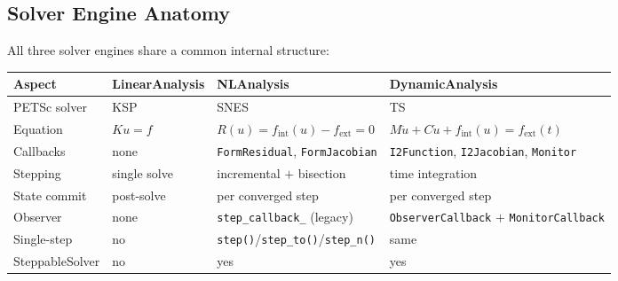 \subsection{Solver Engine Anatomy}
\label{sec:arch:analysis:solvers}

All three solver engines share a common internal structure:

\begin{center}
\small
\begin{tabular}{@{}lp{3.5cm}p{3.5cm}p{3.5cm}@{}}
\toprule
\textbf{Aspect} & \textbf{LinearAnalysis} & \textbf{NLAnalysis} & \textbf{DynamicAnalysis} \\
\midrule
PETSc solver   & KSP              & SNES              & TS \\
Equation       & $Ku = f$         & $R(u) = f_{\text{int}}(u) - f_{\text{ext}} = 0$ & $M\ddot{u} + C\dot{u} + f_{\text{int}}(u) = f_{\text{ext}}(t)$ \\
Callbacks      & none             & \texttt{FormResidual}, \texttt{FormJacobian} & \texttt{I2Function}, \texttt{I2Jacobian}, \texttt{Monitor} \\
Stepping       & single solve     & incremental $+$ bisection & time integration \\
State commit   & post-solve       & per converged step & per converged step \\
Observer       & none             & \texttt{step\_callback\_} (legacy) & \texttt{ObserverCallback} $+$ \texttt{MonitorCallback} \\
Single-step    & no               & \texttt{step()}/\texttt{step\_to()}/\texttt{step\_n()} & same \\
SteppableSolver& no               & yes                & yes \\
\bottomrule
\end{tabular}
\end{center}

